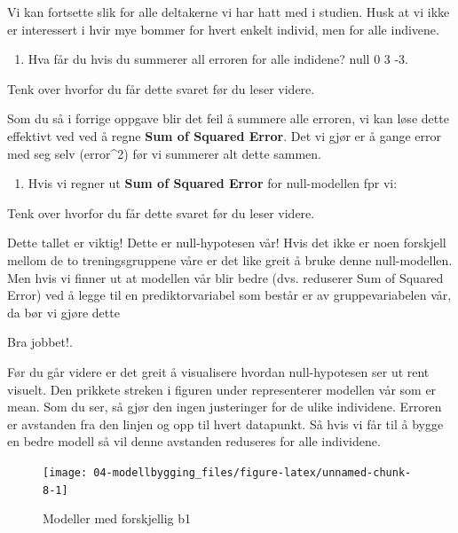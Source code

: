 \documentclass[
]{book}
\providecommand{\tightlist}{%
  \setlength{\itemsep}{0pt}\setlength{\parskip}{0pt}}
\begin{document}
Vi kan fortsette slik for alle deltakerne vi har hatt med i studien. Husk at vi ikke er interessert i hvir mye bommer for hvert enkelt individ, men for alle indivene.

\begin{enumerate}
\def\labelenumi{\alph{enumi}.}
\setcounter{enumi}{4}
\tightlist
\item
  Hva får du hvis du summerer all erroren for alle indidene? null 0 3 -3.
\end{enumerate}

Tenk over hvorfor du får dette svaret før du leser videre.

Som du så i forrige oppgave blir det feil å summere alle erroren, vi kan løse dette effektivt ved ved å regne \textbf{Sum of Squared Error}. Det vi gjør er å gange error med seg selv (error\^{}2) før vi summerer alt dette sammen.

\begin{enumerate}
\def\labelenumi{\alph{enumi}.}
\setcounter{enumi}{5}
\tightlist
\item
  Hvis vi regner ut \textbf{Sum of Squared Error} for null-modellen fpr vi:
\end{enumerate}

Tenk over hvorfor du får dette svaret før du leser videre.

Dette tallet er viktig! Dette er null-hypotesen vår! Hvis det ikke er noen forskjell mellom de to treningsgruppene våre er det like greit å bruke denne null-modellen. Men hvis vi finner ut at modellen vår blir bedre (dvs. reduserer Sum of Squared Error) ved å legge til en prediktorvariabel som består er av gruppevariabelen vår, da bør vi gjøre dette

{Bra jobbet!}.

Før du går videre er det greit å visualisere hvordan null-hypotesen ser ut rent visuelt. Den prikkete streken i figuren under representerer modellen vår som er mean. Som du ser, så gjør den ingen justeringer for de ulike individene. Erroren er avstanden fra den linjen og opp til hvert datapunkt. Så hvis vi får til å bygge en bedre modell så vil denne avstanden reduseres for alle individene.

\begin{figure}

{\centering \texttt{[image: 04-modellbygging\_files/figure-latex/unnamed-chunk-8-1]} 

}

\caption{Modeller med forskjellig b1}\label{fig:unnamed-chunk-8}
\end{figure}
\end{document}
